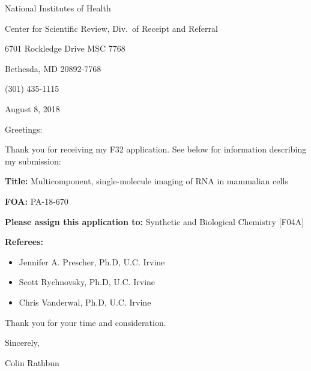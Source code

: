 \documentclass{F32}
\begin{document}
National Institutes of Health

Center for Scientific Review, Div.\ of Receipt and Referral

6701 Rockledge Drive MSC 7768

Bethesda, MD 20892-7768

(301) 435-1115

\vspace{0.5cm}
August 8, 2018

\vspace{0.5cm}
Greetings:

Thank you for receiving my F32 application. See below for information describing my submission:

\vspace{0.5cm}
\textbf{Title:} Multicomponent, single-molecule imaging of RNA in mammalian cells

\vspace{0.5cm}
\textbf{FOA:} PA-18-670

\vspace{0.5cm}
\textbf{Please assign this application to:} Synthetic and Biological Chemistry [F04A]

\vspace{0.5cm}
\textbf{Referees:}
\begin{itemize}
  \item Jennifer A. Prescher, Ph.D, U.C. Irvine
  \item Scott Rychnovsky, Ph.D, U.C. Irvine
  \item Chris Vanderwal, Ph.D, U.C. Irvine
\end{itemize}
\vspace{2cm}
Thank you for your time and consideration.

\vspace{0.5cm}
Sincerely,

\vspace{3cm}
Colin Rathbun
\end{document}
